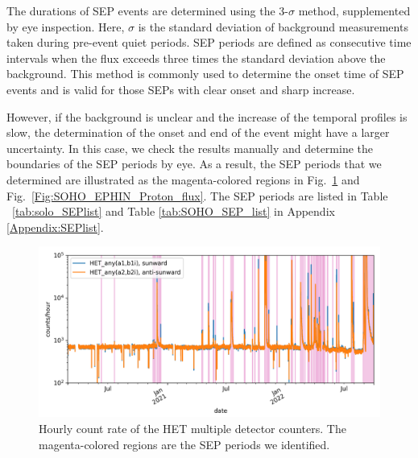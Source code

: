 The durations of \ac{SEP} events are determined using the 3-$\sigma$ method, supplemented by eye inspection. Here, $\sigma$ is the standard deviation of background measurements taken during pre-event quiet periods. \ac{SEP} periods are defined as consecutive time intervals when the flux exceeds three times the standard deviation above the background. This method is commonly used to determine the onset time of \ac{SEP} events and is valid for those \acp{SEP} with clear onset and sharp increase.

However, if the background is unclear and the increase of the temporal profiles is slow, the determination of the onset and end of the event might have a larger uncertainty. In this case, we check the results manually and determine the boundaries of the \ac{SEP} periods by eye. As a result, the \ac{SEP} periods that we determined are illustrated as the magenta-colored regions in Fig.~\ref{Fig:solo-lvl2} and Fig.~\ref{Fig:SOHO_EPHIN_Proton_flux}. The \ac{SEP} periods are listed in Table ~\ref{tab:solo_SEPlist} and Table \ref{tab:SOHO_SEP_list} in Appendix \ref{Appendix:SEPlist}.





\begin{figure}
    \centering
    \includegraphics[width = \textwidth]{images/ACR/SOLO-lvl2-trriger-V2.png}
    \caption[The multiple detector counters of \ac{HET}]{Hourly count rate of the \ac{HET} multiple detector counters. The magenta-colored regions are the \ac{SEP} periods we identified.}
    \label{Fig:solo-lvl2}
\end{figure}



